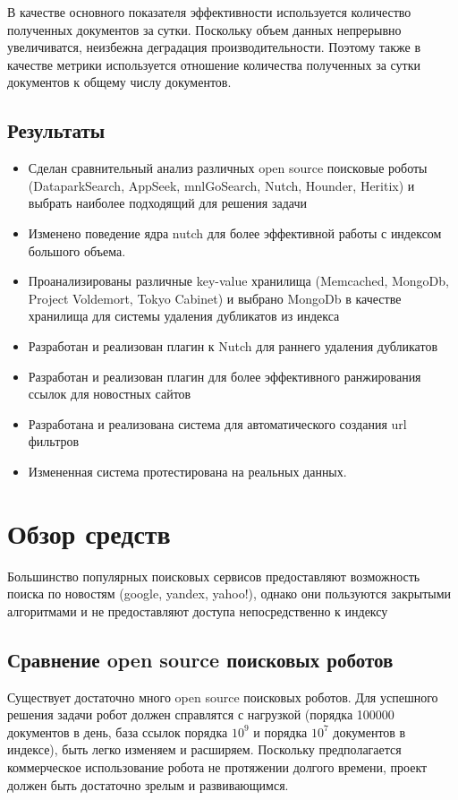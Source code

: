 В качестве основного показателя эффективности используется количество полученных документов за сутки.
 Поскольку объем данных непрерывно увеличиватся, неизбежна деградация производительности.
 Поэтому также в качестве метрики используется отношение количества полученных за сутки документов к общему числу документов.


\section{Результаты}
\begin{itemize}
 \item Сделан сравнительный анализ различных open source поисковые роботы (DataparkSearch,
AppSeek, mnlGoSearch, Nutch, Hounder, Heritix) и выбрать наиболее подходящий для
решения задачи
 \item Изменено поведение ядра nutch для более эффективной работы с индексом большого объема.
 \item Проанализированы различные key-value хранилища (Memcached, MongoDb, Project Voldemort, Tokyo Cabinet) и выбрано MongoDb в качестве хранилища для системы удаления дубликатов из индекса
 \item Разработан и реализован плагин к Nutch для раннего удаления дубликатов
 \item Разработан и реализован плагин для более эффективного ранжирования ссылок для новостных сайтов
 \item Разработана и реализована система для автоматического создания url фильтров
 \item Измененная система протестирована на реальных данных.
\end{itemize}

\chapter{Обзор средств}
Большинство популярных поисковых сервисов предоставляют возможность поиска по новостям (google, yandex, yahoo!), однако они пользуются закрытыми алгоритмами и не предоставляют доступа непосредственно к индексу
\section{Сравнение open source поисковых роботов}
Существует достаточно много open source поисковых роботов. Для успешного решения задачи робот должен справлятся с нагрузкой (порядка 100000 документов в день, база ссылок порядка $10^{9}$ и порядка $10^7$ документов в индексе), быть легко изменяем и расширяем. Поскольку предполагается коммерческое использование робота не протяжении долгого времени, проект должен быть достаточно зрелым и развивающимся.
